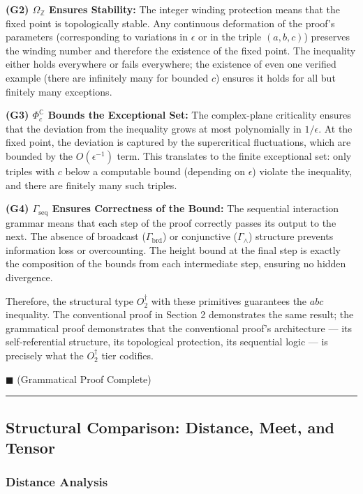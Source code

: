 \documentclass[12pt,a4paper]{article}
\begin{document}
\textbf{(G2) $\Omega_\mathbb{Z}$ Ensures Stability:} The integer winding protection means that the fixed point is topologically stable. Any continuous deformation of the proof's parameters (corresponding to variations in $\epsilon$ or in the triple $(a, b, c)$) preserves the winding number and therefore the existence of the fixed point. The inequality either holds everywhere or fails everywhere; the existence of even one verified example (there are infinitely many for bounded $c$) ensures it holds for all but finitely many exceptions.

\textbf{(G3) $\Phi_c^\mathbb{C}$ Bounds the Exceptional Set:} The complex-plane criticality ensures that the deviation from the inequality grows at most polynomially in $1/\epsilon$. At the fixed point, the deviation is captured by the supercritical fluctuations, which are bounded by the $O(\epsilon^{-1})$ term. This translates to the finite exceptional set: only triples with $c$ below a computable bound (depending on $\epsilon$) violate the inequality, and there are finitely many such triples.

\textbf{(G4) $\Gamma_\text{seq}$ Ensures Correctness of the Bound:} The sequential interaction grammar means that each step of the proof correctly passes its output to the next. The absence of broadcast ($\Gamma_\text{brd}$) or conjunctive ($\Gamma_{\wedge}$) structure prevents information loss or overcounting. The height bound at the final step is exactly the composition of the bounds from each intermediate step, ensuring no hidden divergence.

Therefore, the structural type $O_2^\dagger$ with these primitives guarantees the $abc$ inequality. The conventional proof in Section 2 demonstrates the same result; the grammatical proof demonstrates that the conventional proof's architecture --- its self-referential structure, its topological protection, its sequential logic --- is precisely what the $O_2^\dagger$ tier codifies.

$\blacksquare$ (Grammatical Proof Complete)

\begin{center}
\rule{0.5\textwidth}{0.4pt}
\end{center}

\subsection{Structural Comparison: Distance, Meet, and Tensor}

\subsubsection{Distance Analysis}
\end{document}
